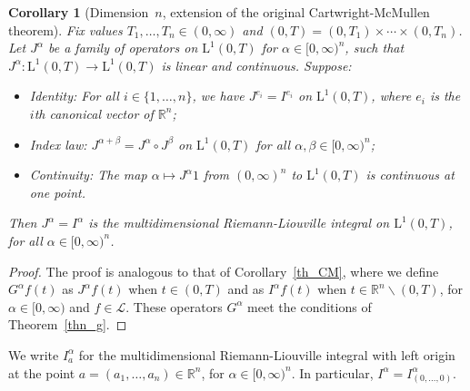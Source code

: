 \documentclass[12pt,reqno]{amsart}
\theoremstyle{plain}
\newtheorem{corollary}[theorem]{Corollary}
\numberwithin{equation}{section} %
\begin{document}
\begin{corollary}[Dimension~$n$, extension of the original Cartwright-McMullen theorem] \label{th_CM22}
Fix values $T_1,\ldots,T_n\in (0,\infty)$ and $(0,T)=(0,T_1)\times\cdots\times (0,T_n)$. Let $J^\alpha$ be a family of operators on $\mathrm{L}^1(0,T)$ for $\alpha\in [0,\infty)^n$, such that $J^\alpha:\mathrm{L}^1(0,T)\rightarrow \mathrm{L}^1(0,T)$ is linear and continuous. Suppose: 
\begin{itemize}
\item Identity: For all $i\in\{1,\ldots,n\}$, we have $J^{e_i}=I^{e_i}$ on $\mathrm{L}^1(0,T)$, where $e_i$ is the $i$th canonical vector of $\mathbb{R}^n$;
\item Index law: $J^{\alpha+\beta}=J^\alpha\circ J^\beta$ on $\mathrm{L}^1(0,T)$ for all $\alpha,\beta\in [0,\infty)^n$; 
\item Continuity: The map $\alpha\mapsto J^{\alpha} 1$ from $(0,\infty)^n$ to $\mathrm{L}^1(0,T)$ is continuous at one point. 
\end{itemize}
Then $J^\alpha=I^\alpha$ is the multidimensional Riemann-Liouville integral on $\mathrm{L}^1(0,T)$, for all $\alpha\in [0,\infty)^n$.
\end{corollary}
\begin{proof}
The proof is analogous to that of Corollary~\ref{th_CM}, where we define $G^\alpha f(t)$ as $J^\alpha f(t)$ when $t\in (0,T)$ and as $I^\alpha f(t)$ when $t\in\mathbb{R}^n\backslash (0,T)$, for $\alpha\in [0,\infty)$ and $f\in\mathcal{L}$. These operators $G^\alpha$ meet the conditions of Theorem~\ref{thn_g}.
\end{proof}

We write $I_a^\alpha$ for the multidimensional Riemann-Liouville integral with left origin at the point $a=(a_1,\ldots,a_n)\in\mathbb{R}^n$, for $\alpha\in [0,\infty)^n$. In particular, $I^\alpha=I_{(0,\ldots,0)}^\alpha$.
\end{document}

